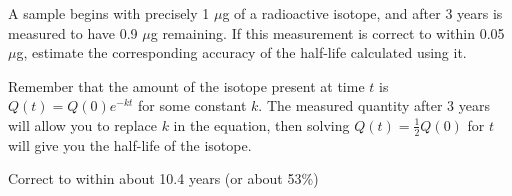 \begin{question}
A sample begins with precisely 1 $\mu$g of a radioactive isotope, and after 3 years is measured to have 0.9 $\mu$g remaining. If this measurement is correct to within 0.05 $\mu$g, estimate the corresponding accuracy of the half-life calculated using it.
\end{question}
\begin{hint}
Remember that the amount of the isotope present at time $t$ is $Q(t)=Q(0)e^{-kt}$ for some constant $k$. The measured quantity after 3 years will allow you to replace $k$ in the equation, then solving $Q(t)=\frac{1}{2}Q(0)$ for $t$ will give you the half-life of the isotope.
\end{hint}
\begin{answer} Correct to within about 10.4 years (or about 53\%)
\end{answer}
